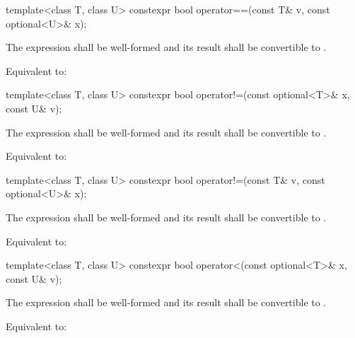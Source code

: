 %
\begin{itemdecl}
template<class T, class U> constexpr bool operator==(const T& v, const optional<U>& x);
\end{itemdecl}

\begin{itemdescr}
\pnum
\requires
The expression  shall be well-formed and
its result shall be convertible to .

\pnum
\effects
Equivalent to: 
\end{itemdescr}

%
\begin{itemdecl}
template<class T, class U> constexpr bool operator!=(const optional<T>& x, const U& v);
\end{itemdecl}

\begin{itemdescr}
\pnum
\requires
The expression  shall be well-formed and
its result shall be convertible to .

\pnum
\effects
Equivalent to: 
\end{itemdescr}

%
\begin{itemdecl}
template<class T, class U> constexpr bool operator!=(const T& v, const optional<U>& x);
\end{itemdecl}

\begin{itemdescr}
\pnum
\requires
The expression  shall be well-formed and
its result shall be convertible to .

\pnum
\effects
Equivalent to: 
\end{itemdescr}

%
\begin{itemdecl}
template<class T, class U> constexpr bool operator<(const optional<T>& x, const U& v);
\end{itemdecl}

\begin{itemdescr}
\pnum
\requires
The expression  shall be well-formed and
its result shall be convertible to .

\pnum
\effects
Equivalent to: 
\end{itemdescr}

